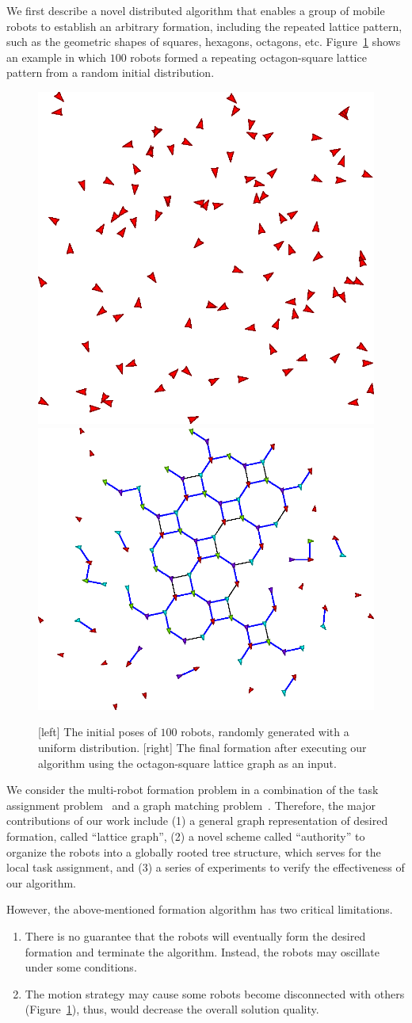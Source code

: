 We first describe a novel distributed algorithm that enables a group of mobile
robots to establish an arbitrary formation, including the repeated lattice
pattern, such as the geometric shapes of squares, hexagons, octagons, etc.
Figure~\ref{fig:octsq-init-final} shows an example in which $100$ robots formed 
a repeating octagon-square lattice pattern from a random initial distribution.
\begin{figure}
  \centering
  \includegraphics[width=.4\columnwidth]{figs/initial-formation}
  \bigskip
  \includegraphics[width=.45\columnwidth]{figs/final-formation}
  \caption{[left] The initial poses of $100$ robots, randomly generated with a
  uniform distribution. [right] The final formation after executing our
  algorithm using the octagon-square lattice graph as an input.}
  \label{fig:octsq-init-final}
\end{figure}
We consider the multi-robot formation problem in a combination of the task
assignment problem~\cite{Kuh55, Mun57} and a graph matching
problem~\cite{Lov86}. Therefore, the major contributions of our work include (1)
a general graph representation of desired formation, called ``lattice graph'',
(2) a novel scheme called ``authority'' to organize the robots into a
globally rooted tree structure, which serves for the local task assignment, 
and (3) a series of experiments to verify the effectiveness of our algorithm.

However, the above-mentioned formation algorithm has two critical limitations.
\begin{enumerate}
\item There is no guarantee that the robots will eventually form the
  desired formation and terminate the algorithm. 
  Instead, the robots may oscillate under some conditions.
\item The motion strategy may cause some robots become
  disconnected with others (Figure~\ref{fig:octsq-init-final}), 
  thus, would decrease the overall solution quality.
\end{enumerate}

